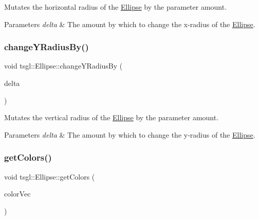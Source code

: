 Mutates the horizontal radius of the \hyperlink{classtsgl_1_1_ellipse}{Ellipse} by the parameter amount. 


\begin{DoxyParams}{Parameters}
{\em delta} & The amount by which to change the x-\/radius of the \hyperlink{classtsgl_1_1_ellipse}{Ellipse}. \\
\hline
\end{DoxyParams}
\mbox{\label{classtsgl_1_1_ellipse_a07c8ee9a4433de42a1b70f6a02385b91}} 
\subsubsection{\texorpdfstring{change\+Y\+Radius\+By()}{changeYRadiusBy()}}
{\footnotesize\ttfamily void tsgl\+::\+Ellipse\+::change\+Y\+Radius\+By (\begin{DoxyParamCaption}\item[{G\+Lfloat}]{delta }\end{DoxyParamCaption})}



Mutates the vertical radius of the \hyperlink{classtsgl_1_1_ellipse}{Ellipse} by the parameter amount. 


\begin{DoxyParams}{Parameters}
{\em delta} & The amount by which to change the y-\/radius of the \hyperlink{classtsgl_1_1_ellipse}{Ellipse}. \\
\hline
\end{DoxyParams}
\mbox{\label{classtsgl_1_1_ellipse_a3d92da146589fc58112945daefafe98f}} 
\subsubsection{\texorpdfstring{get\+Colors()}{getColors()}}
{\footnotesize\ttfamily void tsgl\+::\+Ellipse\+::get\+Colors (\begin{DoxyParamCaption}\item[{std\+::vector$<$ \hyperlink{structtsgl_1_1_color_float}{Color\+Float} $>$ \&}]{color\+Vec }\end{DoxyParamCaption})\hspace{0.3cm}{\ttfamily [virtual]}}



